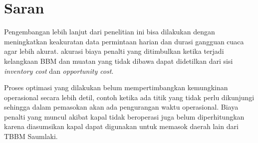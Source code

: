 \section{Saran}
\label{chap:saran}
Pengembangan lebih lanjut dari penelitian ini bisa dilakukan dengan meningkatkan keakuratan data permintaan harian dan durasi gangguan cuaca agar lebih akurat. akurasi biaya penalti yang ditimbulkan ketika terjadi kelangkaan BBM dan muatan yang tidak dibawa dapat didetilkan dari sisi \emph{inventory cost} dan \emph{opportunity cost}.

Proses optimasi yang dilakukan belum mempertimbangkan kemungkinan operasional secara lebih detil, contoh ketika ada titik yang tidak perlu dikunjungi sehingga dalam pemasokan akan ada pengurangan waktu operasional. Biaya penalti yang muncul akibat kapal tidak beroperasi juga belum diperhitungkan karena diasumsikan kapal dapat digunakan untuk memasok daerah lain dari TBBM Saumlaki.



